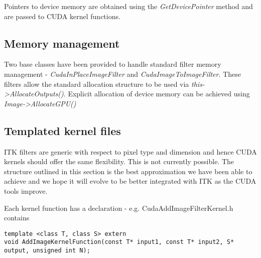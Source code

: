 \documentclass{InsightArticle}
\begin{document}
Pointers to device memory are obtained using the {\em
  GetDevicePointer} method and are passed to CUDA kernel functions.

\subsection{Memory management}
Two base classes have been provided to handle standard filter memory
management - {\em CudaInPlaceImageFilter} and {\em
CudaImageToImageFilter}. These filters allow the standard allocation
structure to be used via {\em this->AllocateOutputs()}. Explicit
allocation of device memory can be achieved using
{\em Image->AllocateGPU()}

\subsection{Templated kernel files}
ITK filters are generic with respect to pixel type and dimension and
hence CUDA kernels should offer the same flexibility. This is not
currently possible. The structure outlined in this section is the best
approximation we have been able to achieve and we hope it will evolve
to be better integrated with ITK as the CUDA tools improve.

Each kernel function has a declaration - e.g. CudaAddImageFilterKernel.h contains
\begin{verbatim}
template <class T, class S> extern
void AddImageKernelFunction(const T* input1, const T* input2, S* output, unsigned int N);
\end{verbatim}
\end{document}
